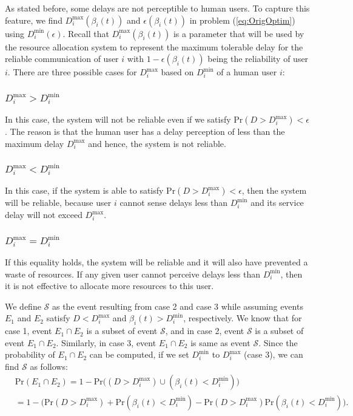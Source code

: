 \documentclass[journal,draftclsnofoot,onecolumn,12pt]{IEEEtran}%
\begin{document}
As stated before, some delays are not perceptible to human users. To capture this feature, we find $D_i^{\max}(\beta_i(t))$ and $\epsilon(\beta_i(t))$ in problem (\ref{eq:OrigOptim}) using $D_i^{\min}(\epsilon)$. Recall that $D_i^{\max}(\beta_i(t))$ is a parameter that will be used by the resource allocation system to represent the maximum tolerable delay for the reliable communication of user $i$ with $1- \epsilon(\beta_i(t))$ being the reliability of user $i$.
There are three possible cases for $D_i^{\max}$ based on $D_i^{\min}$ of a human user $i$:
\subsubsection{$D_i^{\max}>D_i^{\min}$}   In this case, the system will not be reliable even if we satisfy $\text{Pr}(D>D_i^{\max})<\epsilon$. The reason is that the human user has a delay perception of less than the maximum delay $D_i^{\max}$ and hence, the system is not reliable.



 
\subsubsection{$D_i^{\max}<D_i^{\min}$} In this case, if the system is able to satisfy $\text{Pr}(D>D_i^{\max})<\epsilon$, then the system will be reliable, because user $i$ cannot sense delays less than $D_i^{\min}$ and its service delay will not exceed $D_i^{\max}$.

\subsubsection{$D_i^{\max}=D_i^{\min}$} If this equality holds, the system will be reliable and  it will also have prevented a waste of resources. If any given user cannot perceive delays less than $D_i^{\min}$, then it is not effective to allocate more resources to this user.


{We define $\mathcal{S}$ as the event resulting from case 2 and case 3}
{while assuming events $E_1$ and $E_2$ satisfy $D<D_i^{\max}$ and $\beta_i(t)>D_i^{\min}$, respectively.} We know that for case 1,  event $E_1\cap E_2 $ is a subset of  event $\mathcal{S}$, and in case 2,  event $\mathcal{S}$ is a subset of  event $E_1\cap E_2 $. Similarly, in  case 3,  event $E_1\cap E_2 $ is  same as event $\mathcal{S}$. Since the probability of $E_1\cap E_2 $ can be computed, if we set $D_i^{\min}$ to $D_i^{\max}$ (case 3), {we can find $\mathcal{S}$ as follows:}
\begin{align}
&\text{Pr}(E_1\cap E_2 )=1-\text{Pr}\Big((D>D_i^{\max}) \cup (\beta_i(t)<D_i^{\min})\Big)\label{eq:De Morgan}\\
&=1-\Big(\text{Pr}(D>D_i^{\max})+\text{Pr}(\beta_i(t)<D_i^{\min})-\text{Pr}(D>D_i^{\max}) \text{Pr}(\beta_i(t)<D_i^{\min})\Big). \label{eq:independent event}
\end{align}
\end{document}
